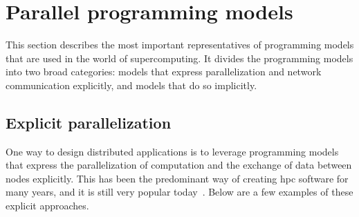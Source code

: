 \section{Parallel programming models}
This section describes the most important representatives of programming models that are used in
the world of supercomputing. It divides the programming models into two broad categories: models
that express parallelization and network communication explicitly, and models that do so
implicitly.

\subsection*{Explicit parallelization}
One way to design distributed applications is to leverage programming models that express the
parallelization of computation and the exchange of data between nodes explicitly. This has been the
predominant way of creating \gls{hpc} software for many years, and it is still very
popular today~\cite{mpiusagestudy1,mpiusagestudy2,mpiusagestudy3}. Below are a few examples of these explicit approaches.

